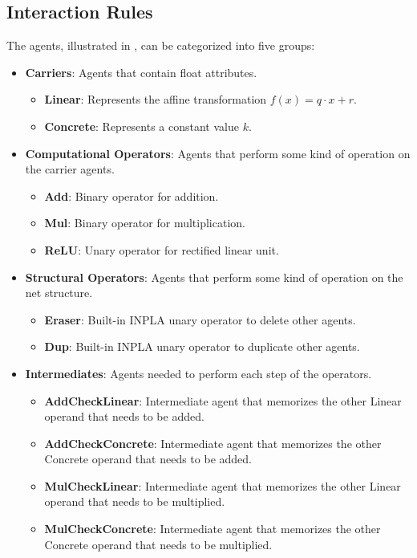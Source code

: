 \subsection{Interaction Rules}
\label{sec:interaction-rules}

The agents, illustrated in \textbf{}, can be categorized into five groups:
\begin{itemize}
	\item
		\textbf{Carriers}: Agents that contain float attributes.
		\begin{itemize}
			\item \textbf{Linear}: Represents the affine transformation $f(x) = q \cdot x + r$.
			\item \textbf{Concrete}: Represents a constant value $k$.
		\end{itemize}
	\item
		\textbf{Computational Operators}: Agents that perform some kind of operation on the carrier agents.
		\begin{itemize}
			\item \textbf{Add}: Binary operator for addition.
			\item \textbf{Mul}: Binary operator for multiplication.
			\item \textbf{ReLU}: Unary operator for rectified linear unit.
		\end{itemize}
	\item
		\textbf{Structural Operators}: Agents that perform some kind of operation on the net structure.
		\begin{itemize}
			\item \textbf{Eraser}: Built-in INPLA unary operator to delete other agents.
			\item \textbf{Dup}: Built-in INPLA unary operator to duplicate other agents.
		\end{itemize}
	\item
		\textbf{Intermediates}: Agents needed to perform each step of the operators.
		\begin{itemize}
			\item \textbf{AddCheckLinear}: Intermediate agent that memorizes the other Linear operand that needs to be added.
			\item \textbf{AddCheckConcrete}: Intermediate agent that memorizes the other Concrete operand that needs to be added.
			\item \textbf{MulCheckLinear}: Intermediate agent that memorizes the other Linear operand that needs to be multiplied.
			\item \textbf{MulCheckConcrete}: Intermediate agent that memorizes the other Concrete operand that needs to be multiplied.

\end{itemize}
\end{itemize}
